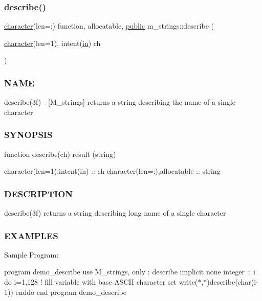 \subsubsection{\texorpdfstring{describe()}{describe()}}
{\footnotesize\ttfamily \hyperlink{option__stopwatch_83_8txt_abd4b21fbbd175834027b5224bfe97e66}{character}(len=\+:) function, allocatable, \hyperlink{M__stopwatch_83_8txt_a2f74811300c361e53b430611a7d1769f}{public} m\+\_\+strings\+::describe (\begin{DoxyParamCaption}\item[{\hyperlink{option__stopwatch_83_8txt_abd4b21fbbd175834027b5224bfe97e66}{character}(len=1), intent(\hyperlink{M__journal_83_8txt_afce72651d1eed785a2132bee863b2f38}{in})}]{ch }\end{DoxyParamCaption})}



\subsubsection*{N\+A\+ME}

describe(3f) -\/ \mbox{[}M\+\_\+strings\mbox{]} returns a string describing the name of a single character 

\subsubsection*{S\+Y\+N\+O\+P\+S\+IS}

\begin{DoxyVerb}function describe(ch) result (string)

 character(len=1),intent(in)   :: ch
 character(len=:),allocatable  :: string
\end{DoxyVerb}


\subsubsection*{D\+E\+S\+C\+R\+I\+P\+T\+I\+ON}

describe(3f) returns a string describing long name of a single character

\subsubsection*{E\+X\+A\+M\+P\+L\+ES}

Sample Program\+:

program demo\+\_\+describe use M\+\_\+strings, only \+: describe implicit none integer \+:\+: i do i=1,128 ! fill variable with base A\+S\+C\+II character set write($\ast$,$\ast$)describe(char(i-\/1)) enddo end program demo\+\_\+describe

